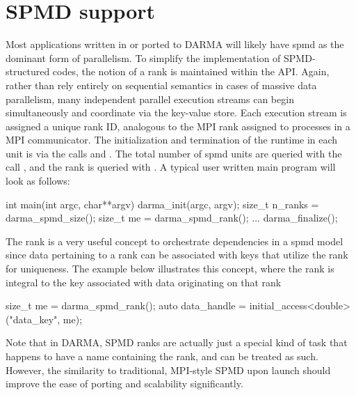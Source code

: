 \section{SPMD support}
\label{sec:spmd}
Most applications written in or ported to DARMA will likely have \gls{spmd} as
the dominant form of parallelism.
To simplify the implementation of SPMD-structured codes, the notion of 
a \gls{rank} is maintained within the \gls{API}.   
Again, rather than rely entirely on sequential semantics in cases of massive data parallelism,
many independent parallel execution streams can begin simultaneously and coordinate via the key-value store.
Each execution stream is assigned a unique rank ID, analogous to the MPI rank assigned to processes in a MPI communicator.
The initialization and termination of the runtime in each unit 
is via the calls  and . 
The total number of \gls{spmd} units are queried with the call ,
and the rank is queried with . A typical user 
written main program will look as follows:
\begin{CppCode}
int main(int argc, char**argv){
  darma_init(argc, argv);
  size_t n_ranks = darma_spmd_size();
  size_t me = darma_spmd_rank();
  ...
  darma_finalize();
}
\end{CppCode}

The rank is a very useful concept to orchestrate dependencies in a \gls{spmd}
model since data pertaining to a rank can be associated with keys that utilize
the rank for uniqueness. The example below illustrates this concept, where
the rank is integral to the key associated with data originating on that rank
\begin{CppCode}
size_t me = darma_spmd_rank();
auto data_handle = initial_access<double>("data_key", me);
\end{CppCode}  
Note that in DARMA, SPMD ranks are actually just a special kind of task that
happens to have a name containing the rank, and can be treated as such. 
However, the similarity to traditional, MPI-style SPMD upon launch should improve the ease of porting and scalability significantly.

